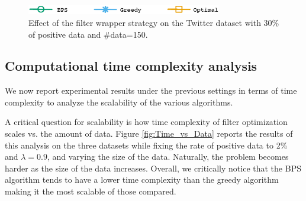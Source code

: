 \begin{figure}[H]
\begin{centering}
\includegraphics[width=8.5cm]{imgs/legend2}
\par\end{centering}
\begin{centering}
\par\end{centering}
\caption{Effect of the filter wrapper strategy on the Twitter dataset with 30\% of positive data and \#data=150.}
\label{fig:FilterWrapperStrategy}
\end{figure}



\subsection{Computational time complexity analysis}
We now report experimental results under the previous settings in terms of time complexity to analyze the scalability of the various algorithms.


 A critical question for scalability is how time complexity of filter optimization scales vs. the amount of data.  Figure \ref{fig:Time_vs_Data} reports the results of this analysis on the three datasets while fixing the rate of positive data to 2\% and $\lambda=0.9$, and varying the size of the data.
Naturally, the problem becomes harder as the size of the data increases.  
Overall, we critically notice that the BPS algorithm tends to have a lower time complexity than the greedy algorithm making it the most scalable of those compared.


